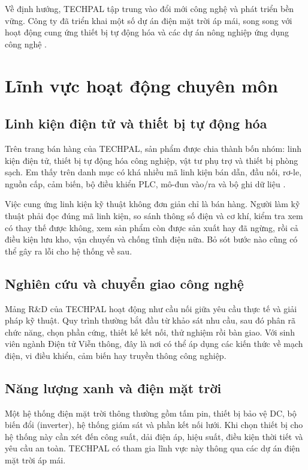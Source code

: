 Về định hướng, TECHPAL tập trung vào đổi mới công nghệ và phát triển bền vững.
Công ty đã triển khai một số dự án điện mặt trời áp mái, song song với hoạt động
cung ứng thiết bị tự động hóa và các dự án nông nghiệp ứng dụng công nghệ
\cite{techpal-intro}.

\section{Lĩnh vực hoạt động chuyên môn}

\subsection{Linh kiện điện tử và thiết bị tự động hóa}

Trên trang bán hàng của TECHPAL, sản phẩm được chia thành bốn nhóm: linh kiện
điện tử, thiết bị tự động hóa công nghiệp, vật tư phụ trợ và thiết bị phòng sạch.
Em thấy trên danh mục có khá nhiều mã linh kiện bán dẫn, đầu nối, rơ-le, nguồn
cấp, cảm biến, bộ điều khiển PLC, mô-đun vào/ra và bộ ghi dữ liệu
\cite{techpal-components}.

Việc cung ứng linh kiện kỹ thuật không đơn giản chỉ là bán hàng. Người làm kỹ
thuật phải đọc đúng mã linh kiện, so sánh thông số điện và cơ khí, kiểm tra xem
có thay thế được không, xem sản phẩm còn được sản xuất hay đã ngừng, rồi cả
điều kiện lưu kho, vận chuyển và chống tĩnh điện nữa. Bỏ sót bước nào cũng có
thể gây ra lỗi cho hệ thống về sau.

\subsection{Nghiên cứu và chuyển giao công nghệ}

Mảng R\&D của TECHPAL hoạt động như cầu nối giữa yêu cầu thực tế và giải pháp
kỹ thuật. Quy trình thường bắt đầu từ khảo sát nhu cầu, sau đó phân rã chức
năng, chọn phần cứng, thiết kế kết nối, thử nghiệm rồi bàn giao. Với sinh viên
ngành Điện tử Viễn thông, đây là nơi có thể áp dụng các kiến thức về mạch điện,
vi điều khiển, cảm biến hay truyền thông công nghiệp.

\subsection{Năng lượng xanh và điện mặt trời}

Một hệ thống điện mặt trời thông thường gồm tấm pin, thiết bị bảo vệ DC, bộ
biến đổi (inverter), hệ thống giám sát và phần kết nối lưới. Khi chọn thiết bị
cho hệ thống này cần xét đến công suất, dải điện áp, hiệu suất, điều kiện thời
tiết và yêu cầu an toàn. TECHPAL có tham gia lĩnh vực này thông qua các dự án
điện mặt trời áp mái.

